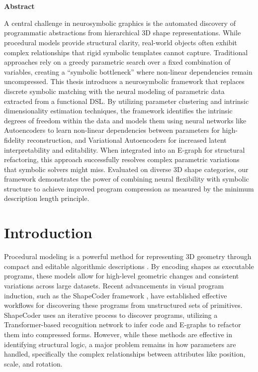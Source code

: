 \documentclass{thesis}
\begin{document}
\makeFrontMatter

\chapter*{}
\begin{center}
    \textbf{Abstract}\\
\end{center}

A central challenge in neurosymbolic graphics is the automated discovery of programmatic abstractions from hierarchical 3D shape representations. While procedural models provide structural clarity, real-world objects often exhibit complex relationships that rigid symbolic templates cannot capture. Traditional approaches rely on a greedy parametric search over a fixed combination of variables, creating a ``symbolic bottleneck'' where non-linear dependencies remain uncompressed. This thesis introduces a neurosymbolic framework that replaces discrete symbolic matching with the neural modeling of parametric data extracted from a functional DSL. By utilizing parameter clustering and intrinsic dimensionality estimation techniques, the framework identifies the intrinsic degrees of freedom within the data and models them using neural networks like Autoencoders to learn non-linear dependencies between parameters for high-fidelity reconstruction, and Variational Autoencoders for increased latent interpretability and editability. When integrated into an E-graph for structural refactoring, this approach successfully resolves complex parametric variations that symbolic solvers might miss. Evaluated on diverse 3D shape categories, our framework demonstrates the power of combining neural flexibility with symbolic structure to achieve improved program compression as measured by the minimum description length principle.

\mainmatter


\chapter{Introduction}\label{ch:introduction}

Procedural modeling is a powerful method for representing 3D geometry through compact and editable algorithmic descriptions \cite{Ritchie2023}. By encoding shapes as executable programs, these models allow for high-level geometric changes and consistent variations across large datasets. Recent advancements in visual program induction, such as the ShapeCoder framework \cite{ShapeCoder}, have established effective workflows for discovering these programs from unstructured sets of primitives. ShapeCoder uses an iterative process to discover programs, utilizing a Transformer-based recognition network \cite{Vaswani2017} to infer code and E-graphs \cite{Willsey2021} to refactor them into compressed forms. However, while these methods are effective in identifying structural logic, a major problem remains in how parameters are handled, specifically the complex relationships between attributes like position, scale, and rotation.
\end{document}
